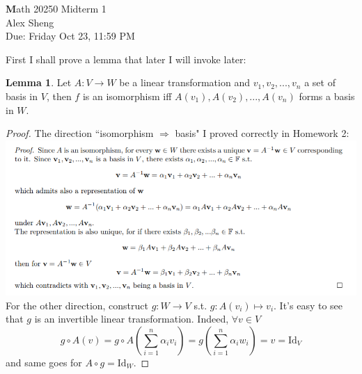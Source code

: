 \documentclass[]{book}
\theoremstyle{definition}
\newtheorem*{lem*}{Lemma}
\newcommand{\0}{\mathbf{0}}
\begin{document}
\begin{center}
{\Large\textbf Math 20250 \hspace{0.5cm} Midterm 1}\\
\large{Alex Sheng}\\
\normalsize{Due: Friday Oct 23, 11:59 PM}
\end{center}

\vspace{0.2 cm}

\noindent First I shall prove a lemma that later I will invoke later:

\begin{lem*}\label{lemma}
Let $A:V\to W$ be a linear transformation and $v_1,v_2,...,v_n$ a set of basis in $V$, then $f$ is an isomorphism iff $A(v_1),A(v_2),...,A(v_n)$ forms a basis in $W$.
\end{lem*}
\begin{proof}
The direction ``isomorphism $\Rightarrow$ basis" I proved correctly in Homework 2:\newline
\includegraphics[scale=1]{images/mid.jpg}\smallbreak
\noindent For the other direction, construct $g:W\to V$ s.t. $g:A(v_i)\mapsto v_i$. It's easy to see that $g$ is an invertible linear transformation. Indeed, $\forall v\in V$
\[g\circ A(v)=g\circ A(\sum_{i=1}^n\alpha_iv_i)=g(\sum_{i=1}^n\alpha_iw_i)=v=\textrm{Id}_V\]
and same goes for $A\circ g=\textrm{Id}_W$.
\end{proof}

\bigbreak
\end{document}
